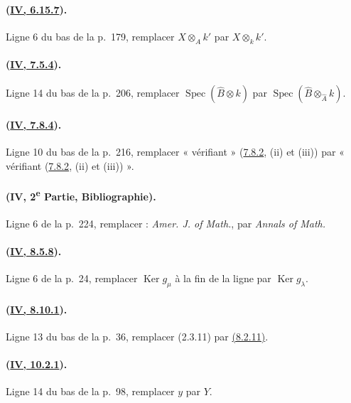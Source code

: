 \paragraph{({\texorpdfstring{\protect\hyperref[canon-index.ega4.c04.prop.6-15-7]{IV, 6.15.7}}{IV, 6.15.7}}).}
Ligne 6 du bas de la p.~179, remplacer $X\otimes_Ak'$ par
$X\otimes_kk'$.

\paragraph{({\texorpdfstring{\protect\hyperref[canon-index.ega4.c04.item.7-5-4]{IV, 7.5.4}}{IV, 7.5.4}}).}
Ligne 14 du bas de la p.~206, remplacer
$\operatorname{Spec}(\widehat B\otimes k)$ par
$\operatorname{Spec}(\widehat B\otimes_{\widehat A}k)$.

\paragraph{({\texorpdfstring{\protect\hyperref[canon-index.ega4.c04.item.7-8-4]{IV, 7.8.4}}{IV, 7.8.4}}).}
Ligne 10 du bas de la p.~216, remplacer « vérifiant »
({\hyperref[canon-index.ega4.c04.def.7-8-2]{7.8.2}}, (ii) et (iii)) par
« vérifiant ({\hyperref[canon-index.ega4.c04.def.7-8-2]{7.8.2}}, (ii) et (iii)) ».

\paragraph{(IV, 2\textsuperscript{e} Partie, Bibliographie).}
Ligne 6 de la p.~224, remplacer : \emph{Amer. J. of Math.}, par
\emph{Annals of Math.}

\paragraph{({\texorpdfstring{\protect\hyperref[canon-index.ega4.c04.cor.8-5-8]{IV, 8.5.8}}{IV, 8.5.8}}).}
Ligne 6 de la p.~24, remplacer $\operatorname{Ker}g_\mu$ à la fin de
la ligne par $\operatorname{Ker}g_\lambda$.

\paragraph{({\texorpdfstring{\protect\hyperref[canon-index.ega4.c04.prop.8-10-1]{IV, 8.10.1}}{IV, 8.10.1}}).}
Ligne 13 du bas de la p.~36, remplacer (2.3.11) par
{\hyperref[canon-index.ega4.c04.cor.8-2-11]{(8.2.11)}}.

\paragraph{({\texorpdfstring{\protect\hyperref[canon-index.ega4.c04.prop.10-2-1]{IV, 10.2.1}}{IV, 10.2.1}}).}
Ligne 14 du bas de la p.~98, remplacer $y$ par $Y$.

